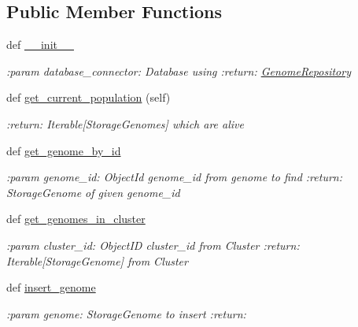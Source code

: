 \subsection*{Public Member Functions}
\begin{DoxyCompactItemize}
\item 
def \hyperlink{classNEAT__PyGenetics_1_1NEAT_1_1Repository_1_1GenomeRepository_1_1GenomeRepository_a2d5029444baeba1137a19954fbdc5192}{\+\_\+\+\_\+init\+\_\+\+\_\+}
\begin{DoxyCompactList}\small\item\em \+:param database\+\_\+connector\+: Database using \+:return\+: \hyperlink{classNEAT__PyGenetics_1_1NEAT_1_1Repository_1_1GenomeRepository_1_1GenomeRepository}{Genome\+Repository} \end{DoxyCompactList}\item 
def \hyperlink{classNEAT__PyGenetics_1_1NEAT_1_1Repository_1_1GenomeRepository_1_1GenomeRepository_a02f46e4d4d2d09b0ac2b69174f49e129}{get\+\_\+current\+\_\+population} (self)
\begin{DoxyCompactList}\small\item\em \+:return\+: Iterable\mbox{[}Storage\+Genomes\mbox{]} which are alive \end{DoxyCompactList}\item 
def \hyperlink{classNEAT__PyGenetics_1_1NEAT_1_1Repository_1_1GenomeRepository_1_1GenomeRepository_ac55f0529efead778623d6e3eadafa138}{get\+\_\+genome\+\_\+by\+\_\+id}
\begin{DoxyCompactList}\small\item\em \+:param genome\+\_\+id\+: Object\+Id genome\+\_\+id from genome to find \+:return\+: Storage\+Genome of given genome\+\_\+id \end{DoxyCompactList}\item 
def \hyperlink{classNEAT__PyGenetics_1_1NEAT_1_1Repository_1_1GenomeRepository_1_1GenomeRepository_a307127db97bbcb6ef6bbb2000e64d36c}{get\+\_\+genomes\+\_\+in\+\_\+cluster}
\begin{DoxyCompactList}\small\item\em \+:param cluster\+\_\+id\+: Object\+ID cluster\+\_\+id from Cluster \+:return\+: Iterable\mbox{[}Storage\+Genome\mbox{]} from Cluster \end{DoxyCompactList}\item 
def \hyperlink{classNEAT__PyGenetics_1_1NEAT_1_1Repository_1_1GenomeRepository_1_1GenomeRepository_ac5457262e579905f051b3a0e4f14cbae}{insert\+\_\+genome}
\begin{DoxyCompactList}\small\item\em \+:param genome\+: Storage\+Genome to insert \+:return\+: \end{DoxyCompactList}\item 

\end{DoxyCompactItemize}
